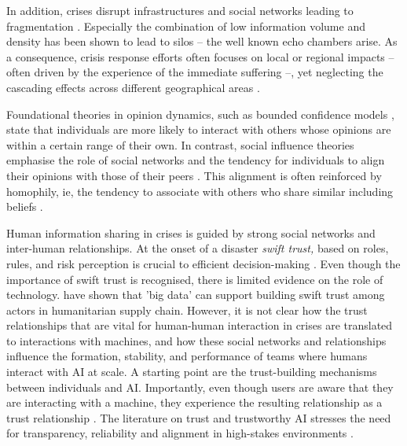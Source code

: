 \documentclass[pdflatex,sn-apa]{sn-jnl}%
\begin{document}
In addition, crises disrupt infrastructures and social networks leading to fragmentation \citep{wolbers2018introducing}. Especially the combination of low information volume and density has been shown to lead to silos \citep{pan2012crisis} -- the well known echo chambers arise. As a consequence, crisis response efforts often focuses on local or regional impacts -- often driven by the experience of the immediate suffering --, yet neglecting the cascading effects across different geographical areas \citep{sigala2022mitigating}.

Foundational theories in opinion dynamics, such as bounded confidence models \citep{hegselmann2002opinion}, state that individuals are more likely to interact with others whose opinions are within a certain range of their own. In contrast, social influence theories emphasise the role of social networks and the tendency for individuals to align their opinions with those of their peers \citep{friedkin1999social}. This alignment is often reinforced by homophily, ie, the tendency to associate with others who share similar including beliefs \citep{mcpherson2001birds}.

Human information sharing in crises is guided by strong social networks and inter-human relationships. At the onset of a disaster \textit{swift trust,} based on roles, rules, and risk perception is crucial to efficient decision-making \citep{tatham2010application}. Even though the importance of swift trust is recognised, there is limited evidence on the role of technology. \citet{dubey2018big} have shown that 'big data' can support building swift trust among actors in humanitarian supply chain. However, it is not clear how the trust relationships that are vital for human-human interaction in crises are translated to interactions with machines, and how these social networks and relationships influence the formation, stability, and performance of teams where humans interact with AI at scale. A starting point are the trust-building mechanisms between individuals and AI. Importantly, even though users are aware that they are interacting with a machine, they experience the resulting relationship as a trust relationship \citep{manzini2024should}. The literature on trust and trustworthy AI stresses the need for transparency, reliability and alignment in high-stakes environments \citep{lee2004trust, glikson2020human}.
\end{document}
